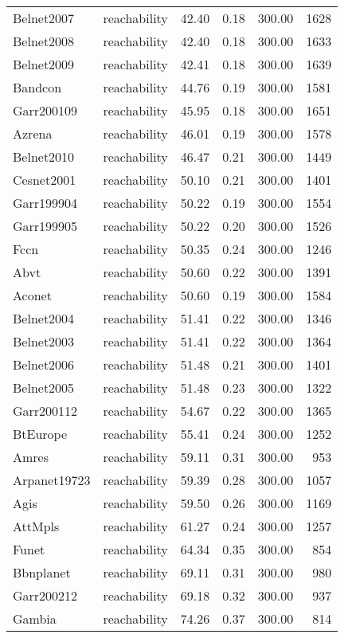 \begin{tabular}{llrrrr}
Belnet2007 & reachability & 42.40 & 0.18 & 300.00 & 1628 \\
Belnet2008 & reachability & 42.40 & 0.18 & 300.00 & 1633 \\
Belnet2009 & reachability & 42.41 & 0.18 & 300.00 & 1639 \\
Bandcon & reachability & 44.76 & 0.19 & 300.00 & 1581 \\
Garr200109 & reachability & 45.95 & 0.18 & 300.00 & 1651 \\
Azrena & reachability & 46.01 & 0.19 & 300.00 & 1578 \\
Belnet2010 & reachability & 46.47 & 0.21 & 300.00 & 1449 \\
Cesnet2001 & reachability & 50.10 & 0.21 & 300.00 & 1401 \\
Garr199904 & reachability & 50.22 & 0.19 & 300.00 & 1554 \\
Garr199905 & reachability & 50.22 & 0.20 & 300.00 & 1526 \\
Fccn & reachability & 50.35 & 0.24 & 300.00 & 1246 \\
Abvt & reachability & 50.60 & 0.22 & 300.00 & 1391 \\
Aconet & reachability & 50.60 & 0.19 & 300.00 & 1584 \\
Belnet2004 & reachability & 51.41 & 0.22 & 300.00 & 1346 \\
Belnet2003 & reachability & 51.41 & 0.22 & 300.00 & 1364 \\
Belnet2006 & reachability & 51.48 & 0.21 & 300.00 & 1401 \\
Belnet2005 & reachability & 51.48 & 0.23 & 300.00 & 1322 \\
Garr200112 & reachability & 54.67 & 0.22 & 300.00 & 1365 \\
BtEurope & reachability & 55.41 & 0.24 & 300.00 & 1252 \\
Amres & reachability & 59.11 & 0.31 & 300.00 & 953 \\
Arpanet19723 & reachability & 59.39 & 0.28 & 300.00 & 1057 \\
Agis & reachability & 59.50 & 0.26 & 300.00 & 1169 \\
AttMpls & reachability & 61.27 & 0.24 & 300.00 & 1257 \\
Funet & reachability & 64.34 & 0.35 & 300.00 & 854 \\
Bbnplanet & reachability & 69.11 & 0.31 & 300.00 & 980 \\
Garr200212 & reachability & 69.18 & 0.32 & 300.00 & 937 \\
Gambia & reachability & 74.26 & 0.37 & 300.00 & 814 \\

\end{tabular}
